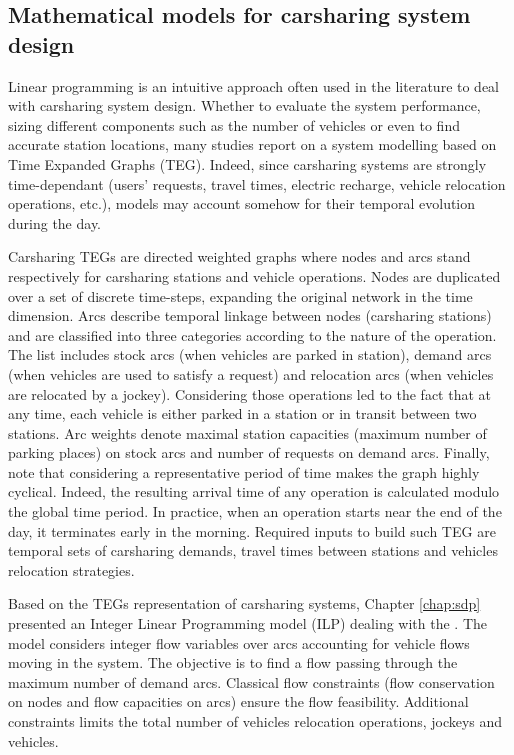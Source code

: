 \subsection{Mathematical models for carsharing system design}
Linear programming is an intuitive approach often used in the literature to deal with carsharing system design.
Whether to evaluate the system performance, sizing different components such as the number of vehicles or even to find accurate station locations, many studies report on a system modelling based on Time Expanded Graphs (TEG).
Indeed, since carsharing systems are strongly time-dependant (users' requests, travel times, electric recharge, vehicle relocation operations, etc.), models may account somehow for their temporal evolution during the day.

Carsharing TEGs are directed weighted graphs where nodes and arcs stand respectively for carsharing stations and vehicle operations.
Nodes are duplicated over a set of discrete time-steps, expanding the original network in the time dimension.
Arcs describe temporal linkage between nodes (carsharing stations) and are classified into three categories according to the nature of the operation.
The list includes stock arcs (when vehicles are parked in station), demand arcs (when vehicles are used to satisfy a request) and relocation arcs (when vehicles are relocated by a jockey).
Considering those operations led to the fact that at any time, each vehicle is either parked in a station or in transit between two stations.
Arc weights denote maximal station capacities (\ie maximum number of parking places) on stock arcs and number of requests on demand arcs.
Finally, note that considering a representative period of time makes the graph highly cyclical.
Indeed, the resulting arrival time of any operation is calculated modulo the global time period.
In practice, when an operation starts near the end of the day, it terminates early in the morning.
Required inputs to build such TEG are temporal sets of carsharing demands, travel times between stations and vehicles relocation strategies.


\medskip
Based on the TEGs representation of carsharing systems, Chapter \ref{chap:sdp} presented an Integer Linear Programming model (ILP) dealing with the {\SDP}.
The model considers integer flow variables over arcs accounting for vehicle flows moving in the system.
The objective is to find a flow passing through the maximum number of demand arcs.
Classical flow constraints (flow conservation on nodes and flow capacities on arcs) ensure the flow feasibility.
Additional constraints limits the total number of vehicles relocation operations, jockeys and vehicles.

